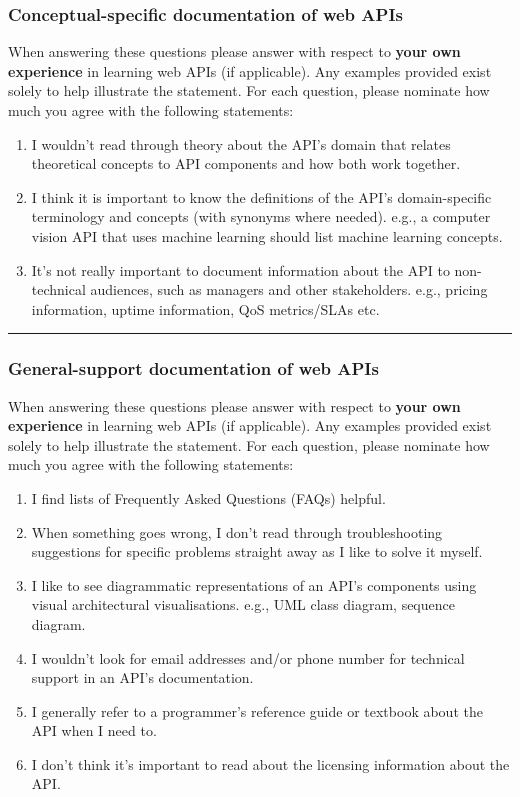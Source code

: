 \subsubsection*{Conceptual-specific documentation of web APIs}\noindent
When answering these questions please answer with respect to \textbf{your own experience} in learning web APIs (if applicable). Any examples provided exist solely to help illustrate the statement. For each question, please nominate how much you agree with the following statements: \AgreementScale

\begin{enumerate}[label=Q5\alph*.,leftmargin=2\parindent]
\item I wouldn’t read through theory about the API's domain that relates theoretical concepts to API components and how both work together. 
\item I think it is important to know the definitions of the API’s domain-specific terminology and concepts (with synonyms where needed). 
   e.g., a computer vision API that uses machine learning should list machine learning concepts. 
\item It's not really important to document information about the API to non-technical audiences, such as managers and other stakeholders. 
   e.g., pricing information, uptime information, QoS metrics/SLAs etc.   
\end{enumerate}

\bigskip\hrule
\subsubsection*{General-support documentation of web APIs}\noindent
When answering these questions please answer with respect to \textbf{your own experience} in learning web APIs (if applicable). Any examples provided exist solely to help illustrate the statement. For each question, please nominate how much you agree with the following statements: \AgreementScale

\begin{enumerate}[label=Q6\alph*.,leftmargin=2\parindent]
\item  I find lists of Frequently Asked Questions (FAQs) helpful. 
\item  When something goes wrong, I don't read through troubleshooting suggestions for specific problems straight away as I like to solve it myself. 
\item  I like to see diagrammatic representations of an API's components using visual architectural visualisations. 
   e.g., UML class diagram, sequence diagram. 
\item  I wouldn't look for email addresses and/or phone number for technical support in an API's documentation. 
\item  I generally refer to a programmer's reference guide or textbook about the API when I need to. 
\item  I don't think it's important to read about the licensing information about the API. 
\end{enumerate}

